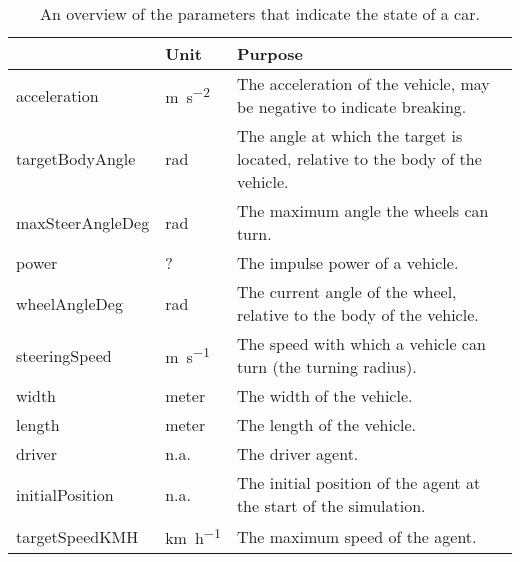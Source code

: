 	\begin{table}
		\centering
		\begin{tabularx}{\textwidth}{>{\ttfamily}llX}
			\toprule
			\normalfont{Parameter}	&Unit & Purpose \\ 
			\midrule
			acceleration 			
				& \si{\meter\per\square\second} 
				& The acceleration of the vehicle, may be negative to indicate breaking.\\ 
			targetBodyAngle 		
				& \si{\radian}
				& The angle at which the target is located, relative to the body of the vehicle. \\ 
			maxSteerAngleDeg 		
				& \si{\radian}
				& The maximum angle the wheels can turn. \\ 
			power 					
				& \si{?}
				& The impulse power of a vehicle. \\ 
			wheelAngleDeg 			
				& \si{\radian}
				& The current angle of the wheel, relative to the body of the vehicle. \\ 
			steeringSpeed 			
				& \si{\meter\per\second}
				& The speed with which a vehicle can turn (the turning radius). \\  
			width 					
				& \si{meter} 
				& The width of the vehicle. \\ 
			length 					
				& \si{meter} 
				& The length of the vehicle. \\ 
			driver 					
				& n.a. 
				& The driver agent. \\ 
			initialPosition 		
				& n.a.
				& The initial position of the agent at the start of the simulation. \\ 
			targetSpeedKMH			
				& \si{\kilo\meter\per\hour}
				& The maximum speed of the agent. \\ 
			\bottomrule
		\end{tabularx}
		\caption{An overview of the parameters that indicate the state of a car.}
		\label{tab:par:method:model:overview:state:lowlevel:car}
	\end{table}

